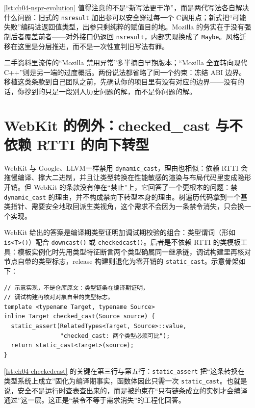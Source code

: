 \documentclass[12pt,a4paper,fontset=fandol]{ctexbook}
\newcommand{\Fn}[1]{\texttt{#1()}}
\newcommand{\Tp}[1]{\texttt{#1}}
\newcommand{\Bk}{\discretionary{}{}{}}
\newcommand{\Lang}[1]{\textsf{#1}}
\newcommand{\CL}{\Lang{C}}
\newcommand{\CPP}{\Lang{C++}}
\newcommand{\DomGo}{\Lang{Google}}
\newcommand{\DomLlvm}{\Lang{LLVM}}
\begin{document}
\ref{lst:ch04-nspr-evolution} 值得注意的不是``新写法更干净''，而是两代写法各自解决什么问题：旧式的 \Tp{nsresult} 加出参可以安全穿过每一个 \CL 调用点；新式把``可能失败''编码进返回值类型，出参只剩纯粹的赋值目的地。Mozilla 的务实在于没有强制后者覆盖前者——对外接口仍返回 \Tp{nsresult}，内部实现换成了 \Tp{Maybe}。风格迁移在这里是分层推进，而不是一次性宣判旧写法有罪。

\begin{warning}[title={把历史禁令读成现行禁令}]
二手资料里流传的``Mozilla 禁用异常''多半摘自早期版本；``Mozilla 全面转向现代 \CPP''则是另一端的过度概括。两份说法都省略了同一个约束：冻结 ABI 边界。移植这类条款到自己团队之前，先确认你的项目里有没有对应的边界——没有的话，你抄到的只是一段别人历史问题的解，而不是你问题的解。
\end{warning}

\section{WebKit 的例外：checked\_cast 与不依赖 RTTI 的向下转型}
\label{sec:ch04-webkit-checkedcast}

WebKit 与 \DomGo、\DomLlvm 一样禁用 \Tp{dynamic\_\allowbreak cast}，理由也相似：依赖 RTTI 会拖慢编译、撑大二进制，并且让类型转换在性能敏感的渲染与布局代码里变成隐形开销。但 WebKit 的条款没有停在``禁止''上，它回答了一个更根本的问题：禁 \Tp{dynamic\_\allowbreak cast} 的理由，并不构成禁向下转型本身的理由。树遍历代码拿到一个基类指针、需要安全地取回派生类视角，这个需求不会因为一条禁令消失，只会换一个实现。

WebKit 给出的答案是编译期类型证明加调试期校验的组合：类型谓词（形如 \Tp{is}\Tp{<T>()}）配合 \Fn{downcast{\Bk}} 或 \Fn{checked{\Bk}cast}。后者是不依赖 RTTI 的类模板工具：模板实例化时先用类型特征断言两个类型确属同一继承链，调试构建里再核对节点自带的类型标志，release 构建则退化为零开销的 \Tp{static\_cast}。示意骨架如下：

\begin{lstlisting}[style=cppstyle,caption={checked\_cast 的示意骨架：编译期链条断言加调试期标志校验},label={lst:ch04-checkedcast}]
// 示意实现，不是仓库原文：类型链条在编译期证明，
// 调试构建再核对对象自带的类型标志。
template <typename Target, typename Source>
inline Target checked_cast(Source source) {
  static_assert(RelatedTypes<Target, Source>::value,
                "checked_cast: 两个类型必须可比");
  return static_cast<Target>(source);
}
\end{lstlisting}

\ref{lst:ch04-checkedcast} 的关键在第三行与第五行：\Tp{static\_assert} 把``这条转换在类型系统上成立''固化为编译期事实，函数体因此只需一次 \Tp{static\_cast}。也就是说，安全不是运行时查表查出来的，而是被约束在``只有链条成立的实例才会编译通过''这一层。这正是``禁令不等于需求消失''的工程化回答。
\end{document}
